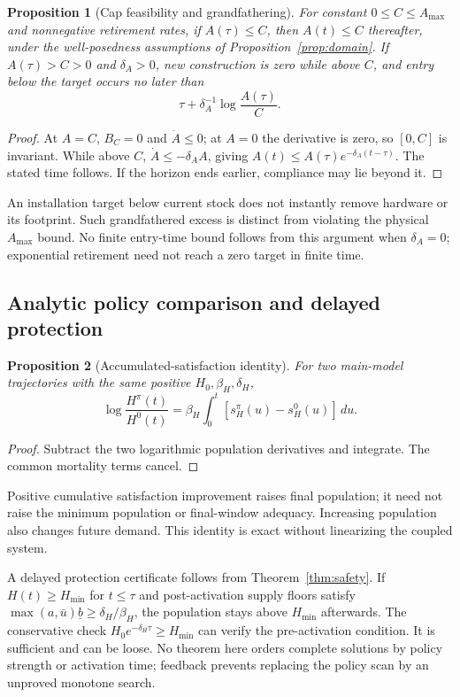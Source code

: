 \documentclass[12pt,a4paper]{article}
\newtheorem{proposition}{Proposition}[section]
\theoremstyle{remark}
\newcommand{\Hmin}{H_{\min}}
\begin{document}
\begin{proposition}[Cap feasibility and grandfathering]\label{prop:cap}
For constant $0\le C\le A_{\max}$ and nonnegative retirement rates, if $A(\tau)\le C$, then $A(t)\le C$ thereafter, under the well-posedness assumptions of Proposition~\ref{prop:domain}. If $A(\tau)>C>0$ and $\delta_A>0$, new construction is zero while above $C$, and entry below the target occurs no later than
\begin{equation}
\tau+\delta_A^{-1}\log\frac{A(\tau)}{C}.
\end{equation}
\end{proposition}
\begin{proof}
At $A=C$, $B_C=0$ and $\dot A\le0$; at $A=0$ the derivative is zero, so $[0,C]$ is invariant. While above $C$, $\dot A\le-\delta_AA$, giving $A(t)\le A(\tau)e^{-\delta_A(t-\tau)}$. The stated time follows. If the horizon ends earlier, compliance may lie beyond it.
\end{proof}
An installation target below current stock does not instantly remove hardware or its footprint. Such grandfathered excess is distinct from violating the physical $A_{\max}$ bound. No finite entry-time bound follows from this argument when $\delta_A=0$; exponential retirement need not reach a zero target in finite time.

\subsection{Analytic policy comparison and delayed protection}
\begin{proposition}[Accumulated-satisfaction identity]\label{prop:identity}
For two main-model trajectories with the same positive $H_0,\beta_H,\delta_H$,
\begin{equation}\label{eq:identity}
\log\frac{H^\pi(t)}{H^0(t)}
=\beta_H\int_0^t[s_H^\pi(u)-s_H^0(u)]\,du.
\end{equation}
\end{proposition}
\begin{proof}
Subtract the two logarithmic population derivatives and integrate. The common mortality terms cancel.
\end{proof}
Positive cumulative satisfaction improvement raises final population; it need not raise the minimum population or final-window adequacy. Increasing population also changes future demand. This identity is exact without linearizing the coupled system.

A delayed protection certificate follows from Theorem~\ref{thm:safety}. If $H(t)\ge\Hmin$ for $t\le\tau$ and post-activation supply floors satisfy $\max(a,\bar u)\underline b\ge\delta_H/\beta_H$, the population stays above $\Hmin$ afterwards. The conservative check $H_0e^{-\delta_H\tau}\ge\Hmin$ can verify the pre-activation condition. It is sufficient and can be loose. No theorem here orders complete solutions by policy strength or activation time; feedback prevents replacing the policy scan by an unproved monotone search.
\end{document}
